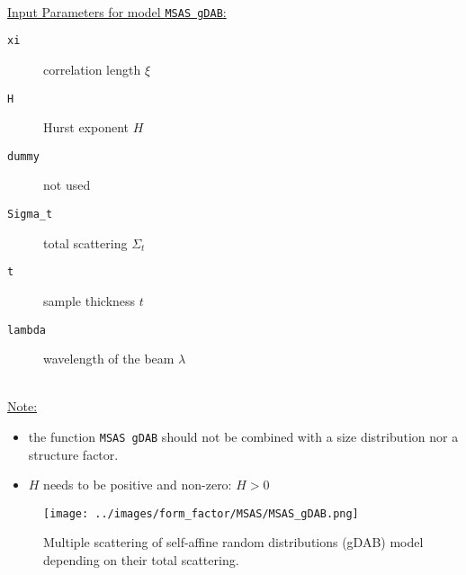 \hspace{1pt}\\
\uline{Input Parameters for model \texttt{MSAS gDAB}:}\\
\begin{description}
\item[\texttt{xi}] correlation length $\xi$
\item[\texttt{H}] Hurst exponent $H$
\item[\texttt{dummy}] not used
\item[\texttt{Sigma\_t}] total scattering $\Sigma_t$
\item[\texttt{t}] sample thickness $t$
\item[\texttt{lambda}] wavelength of the beam $\lambda$
\end{description}

\hspace{1pt}\\
\uline{Note:}
\begin{itemize}
\item the function \texttt{MSAS gDAB} should not be combined with a size distribution nor a structure factor.
\item $H$ needs to be positive and non-zero: $H > 0$
\end{itemize}

\begin{figure}[htb]
\begin{center}
\texttt{[image: ../images/form\_factor/MSAS/MSAS\_gDAB.png]}
\end{center}
\caption{Multiple scattering of self-affine random distributions (gDAB) model depending on their total scattering.}
\label{fig:MSAS_gDAB}
\end{figure} 